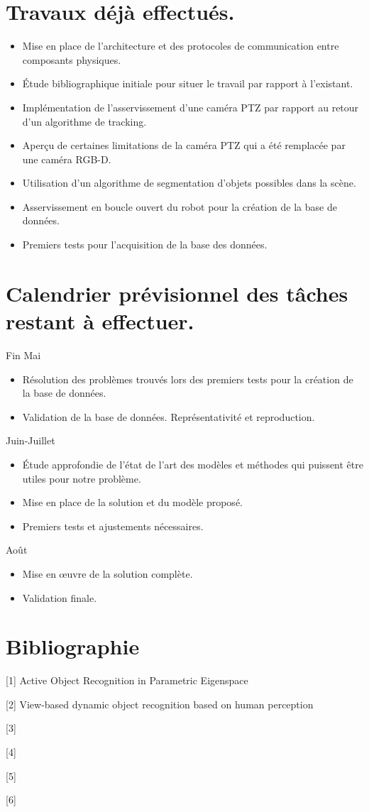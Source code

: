 \section{Travaux déjà effectués.}
\begin{itemize}
    \item[\checkmark] Mise en place de l'architecture et des protocoles de communication entre composants physiques.
    \item[\checkmark] Étude bibliographique initiale pour situer le travail par rapport à l'existant.
    \item[\checkmark] Implémentation de l'asservissement d'une caméra PTZ par rapport au retour d'un algorithme de tracking.
    \item[\checkmark] Aperçu de certaines limitations de la caméra PTZ qui a été remplacée par une caméra RGB-D.
    \item[\checkmark] Utilisation d'un algorithme de segmentation d'objets possibles dans la scène.
    \item[\checkmark] Asservissement en boucle ouvert du robot pour la création de la base de données.
    \item[\checkmark] Premiers tests pour l'acquisition de la base des données.
\end{itemize}

\section{Calendrier prévisionnel des tâches restant à effectuer.}
Fin Mai
\begin{itemize}
    \item Résolution des problèmes trouvés lors des premiers tests pour la création de la base de données.
    \item Validation de la base de données. Représentativité et reproduction.
\end{itemize}

Juin-Juillet
\begin{itemize}
    \item Étude approfondie de l’état de l'art des modèles et méthodes qui puissent être utiles pour notre problème.
    \item Mise en place de la solution et du modèle proposé.
    \item Premiers tests et ajustements nécessaires.
\end{itemize}

Août
\begin{itemize}
    \item Mise en œuvre de la solution complète.
    \item Validation finale.
\end{itemize}

\section{Bibliographie}

[1] Active Object Recognition in Parametric Eigenspace

[2] View-based dynamic object recognition based on human perception

[3]

[4]

[5]

[6]

